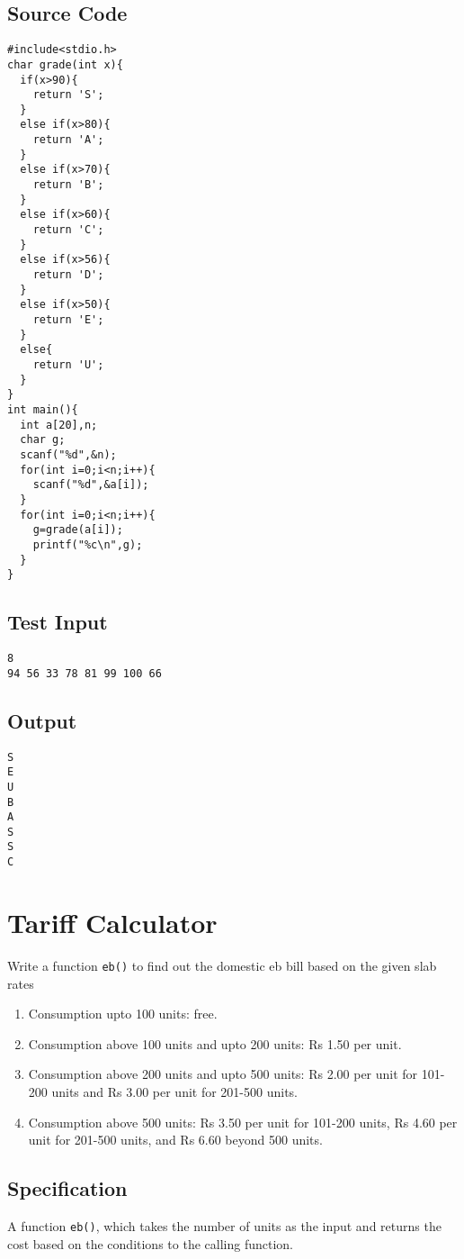 \documentclass[11pt]{article}
\begin{document}
\subsection*{Source Code}
\label{sec-5-5}

\begin{verbatim}
#include<stdio.h>
char grade(int x){
  if(x>90){
    return 'S';
  }
  else if(x>80){
    return 'A';
  }
  else if(x>70){
    return 'B';
  }
  else if(x>60){
    return 'C';
  }
  else if(x>56){
    return 'D';
  }
  else if(x>50){
    return 'E';
  }
  else{
    return 'U';
  }
}  
int main(){
  int a[20],n;
  char g;
  scanf("%d",&n);
  for(int i=0;i<n;i++){
    scanf("%d",&a[i]);
  }
  for(int i=0;i<n;i++){
    g=grade(a[i]);
    printf("%c\n",g);
  }
}
\end{verbatim}

\subsection*{Test Input}
\label{sec-5-6}
\begin{verbatim}
8
94 56 33 78 81 99 100 66
\end{verbatim}
\subsection*{Output}
\label{sec-5-7}
\begin{verbatim}
S 
E 
U 
B 
A 
S
S 
C 
\end{verbatim}

\section{Tariff Calculator}
\label{sec-6}
Write a function \texttt{eb()} to find out the domestic eb bill based on the given slab rates
\begin{enumerate}
\item Consumption upto 100 units: free.
\item Consumption above 100 units and upto 200 units: Rs 1.50 per unit.
\item Consumption above 200 units and upto 500 units: Rs 2.00 per unit 
for 101-200 units and Rs 3.00 per unit for 201-500 units.
\item Consumption above 500 units: Rs 3.50 per unit for 101-200 units, 
Rs 4.60 per unit for 201-500 units, and Rs 6.60 beyond 500 units.
\end{enumerate}
\subsection*{Specification}
\label{sec-6-1}
A function \texttt{eb()}, which takes the number of units as the input and returns the cost
based on the conditions to the calling function.
\end{document}
